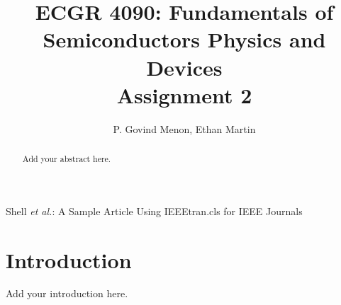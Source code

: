 \documentclass[journal]{IEEEtran}
\begin{document}
\title{ECGR 4090: Fundamentals of Semiconductors Physics and Devices\\Assignment 2}

\author{P. Govind Menon, Ethan Martin}

%
{Shell \MakeLowercase{\textit{et al.}}: A Sample Article Using IEEEtran.cls for IEEE Journals}

\maketitle

\begin{abstract}
Add your abstract here.
\end{abstract}

\section{Introduction}
Add your introduction here.
\end{document}
